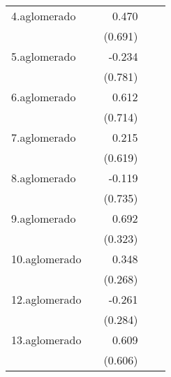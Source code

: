 {\begin{longtable}{l*{4}{D{.}{.}{-1}}}
\addlinespace
4.aglomerado&                     &       0.470         &                     &                     \\
            &                     &     (0.691)         &                     &                     \\
\addlinespace
5.aglomerado&                     &      -0.234         &                     &                     \\
            &                     &     (0.781)         &                     &                     \\
\addlinespace
6.aglomerado&                     &       0.612         &                     &                     \\
            &                     &     (0.714)         &                     &                     \\
\addlinespace
7.aglomerado&                     &       0.215         &                     &                     \\
            &                     &     (0.619)         &                     &                     \\
\addlinespace
8.aglomerado&                     &      -0.119         &                     &                     \\
            &                     &     (0.735)         &                     &                     \\
\addlinespace
9.aglomerado&                     &       0.692\sym{*}  &                     &                     \\
            &                     &     (0.323)         &                     &                     \\
\addlinespace
10.aglomerado&                     &       0.348         &                     &                     \\
            &                     &     (0.268)         &                     &                     \\
\addlinespace
12.aglomerado&                     &      -0.261         &                     &                     \\
            &                     &     (0.284)         &                     &                     \\
\addlinespace
13.aglomerado&                     &       0.609         &                     &                     \\
            &                     &     (0.606)         &                     &                     \\

\end{longtable}}
